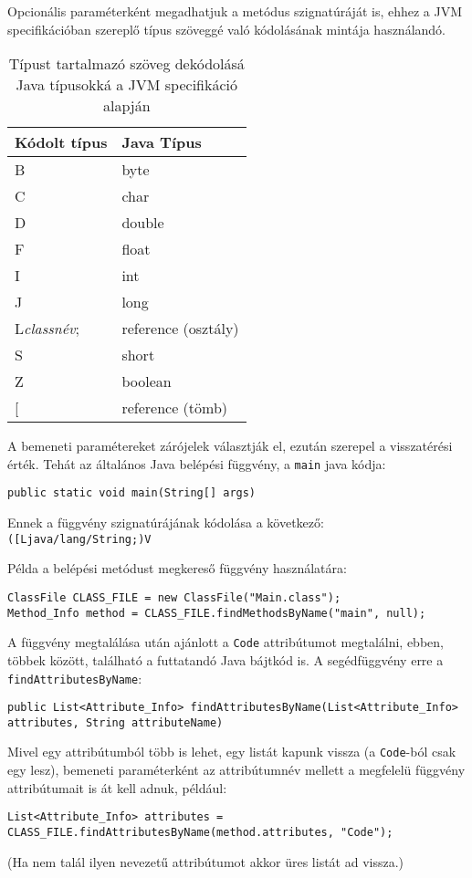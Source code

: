 Opcionális paraméterként megadhatjuk a metódus szignatúráját is, ehhez a JVM specifikációban szereplő típus szöveggé való kódolásának mintája használandó.
\begin{table}[H]
	\centering
	\begin{tabular}{ | m{} | m{} | }
		\hline
		\textbf{Kódolt típus} & \textbf{Java Típus} \\
		\hline \hline
		B & byte \\
		\hline
		C & char \\
		\hline
		D & double \\
		\hline
		F & float \\
		\hline
		I & int \\
		\hline
		J & long \\
		\hline
		L\textit{classnév}; & reference (osztály) \\
		\hline
		S & short \\
		\hline
		Z & boolean \\
		\hline
		{[} & reference (tömb) \\
		\hline
	\end{tabular}
	\caption{Típust tartalmazó szöveg dekódolásá Java típusokká a JVM specifikáció alapján}
	\label{tab:jvmtypeencoding}
\end{table}

A bemeneti paramétereket zárójelek választják el, ezután szerepel a visszatérési érték. Tehát az általános Java belépési függvény, a \lstinline{main} java kódja:
\begin{verbatim}
public static void main(String[] args)
\end{verbatim}
Ennek a függvény szignatúrájának kódolása a következő: \lstinline{([Ljava/lang/String;)V}

Példa a belépési metódust megkereső függvény használatára:
\begin{verbatim}
ClassFile CLASS_FILE = new ClassFile("Main.class");
Method_Info method = CLASS_FILE.findMethodsByName("main", null);
\end{verbatim}

A függvény megtalálása után ajánlott a \lstinline{Code} attribútumot megtalálni, ebben, többek között, található a futtatandó Java bájtkód is. A segédfüggvény erre a \lstinline{findAttributesByName}:
\begin{verbatim}
public List<Attribute_Info> findAttributesByName(List<Attribute_Info> attributes, String attributeName)
\end{verbatim}
Mivel egy attribútumból több is lehet, egy listát kapunk vissza (a \lstinline{Code}-ból csak egy lesz), bemeneti paraméterként az attribútumnév mellett a megfelelü függvény attribútumait is át kell adnuk, például:
\begin{verbatim}
List<Attribute_Info> attributes = CLASS_FILE.findAttributesByName(method.attributes, "Code");
\end{verbatim}
(Ha nem talál ilyen nevezetű attribútumot akkor üres listát ad vissza.)

